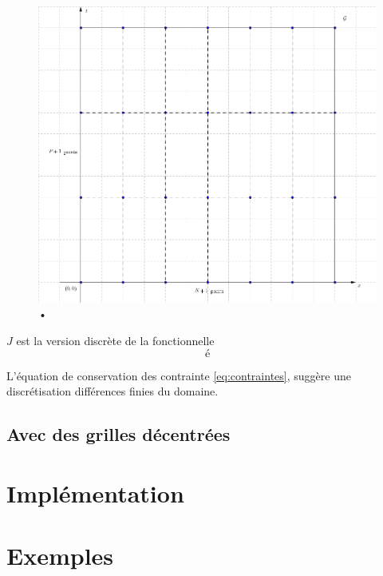 \documentclass[a4paper,12pt]{article}
\begin{document}
\begin{figure}[!h]
\centering
\includegraphics[width=0.8\linewidth]{img/grille_centree.png}
\caption{•}
\end{figure}

$J$ est la version discrète de la fonctionnelle
$$
é
$$


L'équation de conservation des contrainte \eqref{eq:contraintes}, suggère une discrétisation différences finies du domaine. 



\subsection{Avec des grilles décentrées}
\section{Implémentation}

\section{Exemples}
\end{document}
